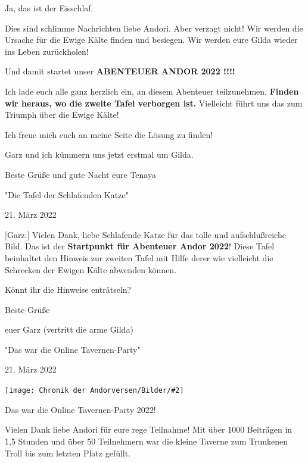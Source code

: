 \documentclass[10pt, a4paper, oneside]{book}
\newcommand{\bildmitts}[2][height=0.32\textwidth,width=0.48\textwidth,keepaspectratio]{%
    \begin{center}
        \texttt{[image: Chronik der Andorversen/Bilder/\#2]}
    \end{center}
}
\begin{document}
\begin{multicols}{2}
Ja, das ist der Eisschlaf.

Dies sind schlimme Nachrichten liebe Andori. Aber verzagt nicht! Wir werden die Ursache für die Ewige Kälte finden und besiegen. Wir werden eure Gilda wieder ins Leben zurückholen!


Und damit startet unser \textbf{ABENTEUER ANDOR 2022 !!!!}

Ich lade euch alle ganz herzlich ein, an diesem Abenteuer teilzunehmen. \textbf{Finden wir heraus, wo die zweite Tafel verborgen ist.} Vielleicht führt uns das zum Triumph über die Ewige Kälte!

Ich freue mich euch an meine Seite die Lösung zu finden!

Garz und ich kümmern uns jetzt erstmal um Gilda.

Beste Grüße und gute Nacht
eure Tenaya




\begin{center}
    "Die Tafel der Schlafenden Katze"

    21. März 2022
\end{center}




[Garz:] Vielen Dank, liebe Schlafende Katze für das tolle und aufschlußreiche Bild. Das ist der \textbf{Startpunkt für Abenteuer Andor 2022}! Diese Tafel beinhaltet den Hinweis zur zweiten Tafel mit Hilfe derer wie vielleicht die Schrecken der Ewigen Kälte abwenden können.

Könnt ihr die Hinweise enträtseln?


Beste Grüße

euer Garz (vertritt die arme Gilda)


\begin{center}
    "Das war die Online Tavernen-Party"

    21. März 2022
\end{center}

\bildmitts{AA2022 Das war die Online Tavernen-Party.jpeg}

Das war die Online Tavernen-Party 2022!

Vielen Dank liebe Andori für eure rege Teilnahme! Mit über 1000 Beiträgen in 1,5 Stunden und über 50 Teilnehmern war die kleine Taverne zum Trunkenen Troll bis zum letzten Platz gefüllt.


\end{multicols}
\end{document}
